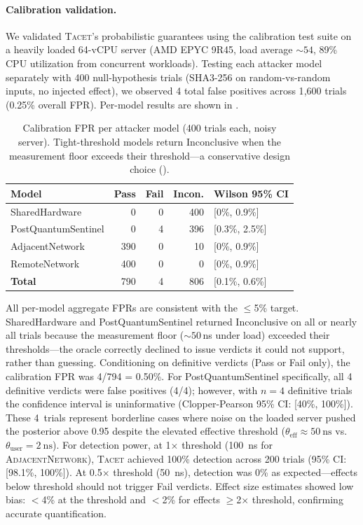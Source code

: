 \documentclass[letterpaper,twocolumn,10pt]{article}
\newcommand{\tacet}{\textsc{Tacet}\xspace}
\newcommand{\ns}[1]{\SI{#1}{\nano\second}}
\begin{document}
\paragraph{Calibration validation.}
We validated \tacet's probabilistic guarantees using the calibration test suite
on a heavily loaded 64-vCPU server (AMD EPYC 9R45, load average ${\sim}54$,
89\% CPU utilization from concurrent workloads).
Testing each attacker model separately with 400 null-hypothesis trials
(SHA3-256 on random-vs-random inputs, no injected effect), we observed 4 total
false positives across 1{,}600 trials (0.25\% overall FPR).
Per-model results are shown in .
%
\begin{table}[h]
\centering
\small
\caption{Calibration FPR per attacker model (400 trials each, noisy server).
         Tight-threshold models return Inconclusive when the measurement floor
         exceeds their threshold---a conservative design choice ().}
\label{tab:calibration_fpr}
\begin{tabular}{@{}lrrrl@{}}
\toprule
\textbf{Model} & \textbf{Pass} & \textbf{Fail} & \textbf{Incon.} & \textbf{Wilson 95\% CI} \\
\midrule
SharedHardware      &   0 & 0 & 400 & [0\%, 0.9\%] \\
PostQuantumSentinel &   0 & 4 & 396 & [0.3\%, 2.5\%] \\
AdjacentNetwork     & 390 & 0 &  10 & [0\%, 0.9\%] \\
RemoteNetwork       & 400 & 0 &   0 & [0\%, 0.9\%] \\
\midrule
\textbf{Total}      & 790 & 4 & 806 & [0.1\%, 0.6\%] \\
\bottomrule
\end{tabular}
\end{table}
%
All per-model aggregate FPRs are consistent with the $\leq$5\% target.
SharedHardware and PostQuantumSentinel returned Inconclusive on all or nearly all
trials because the measurement floor (${\sim}50$\,ns under load) exceeded their
thresholds---the oracle correctly declined to issue verdicts it
could not support, rather than guessing.
%
Conditioning on definitive verdicts (Pass or Fail only), the calibration FPR
was 4/794 = 0.50\%.
For PostQuantumSentinel specifically, all 4 definitive verdicts were false
positives (4/4); however, with $n{=}4$ definitive trials the confidence interval
is uninformative (Clopper-Pearson 95\% CI: [40\%, 100\%]).
These 4~trials represent borderline cases where noise on the loaded server
pushed the posterior above 0.95 despite the elevated effective threshold
($\theta_{\text{eff}} \approx \ns{50}$ vs.\ $\theta_{\text{user}} = \ns{2}$).
%
For detection power, at 1$\times$ threshold (\ns{100} for \textsc{AdjacentNetwork}),
\tacet achieved 100\% detection across 200 trials (95\% CI: [98.1\%, 100\%]).
At 0.5$\times$ threshold (\ns{50}), detection was 0\% as expected---effects below
threshold should not trigger Fail verdicts.
%
Effect size estimates showed low bias: $<$4\% at the threshold and $<$2\% for
effects $\geq$2$\times$ threshold, confirming accurate quantification.
\end{document}
